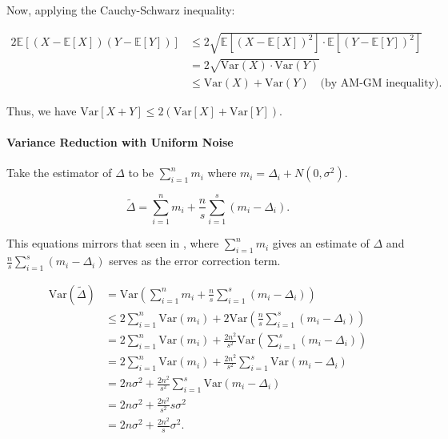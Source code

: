 \documentclass[11pt, margin=1in]{article}
\begin{document}
Now, applying the Cauchy-Schwarz inequality:

\[
\begin{aligned}
2\mathbb{E}[(X - \mathbb{E}[X])(Y - \mathbb{E}[Y])] 
&\leq 2 \sqrt{\mathbb{E}[(X - \mathbb{E}[X])^2] \cdot \mathbb{E}[(Y - \mathbb{E}[Y])^2]} \\
&= 2 \sqrt{\mathrm{Var}(X) \cdot \mathrm{Var}(Y)} \\
&\leq \mathrm{Var}(X) + \mathrm{Var}(Y) \quad \text{(by AM-GM inequality)}.
\end{aligned}
\]

Thus, we have $\mathrm{Var}\left[X+Y\right] \leq 2\left(\mathrm{Var}\left[X\right] + \mathrm{Var}\left[Y\right]\right)$.

\paragraph{Variance Reduction with Uniform Noise}

Take the estimator of $\Delta$ to be $\sum_{i = 1}^{n} m_i$ where $m_i = \Delta_i + N\left(0, \sigma^2\right)$.

\[
\tilde{\Delta} = \sum_{i = 1}^{n} m_i + \frac{n}{s} \sum_{i = 1}^{s} \left(m_i - \Delta_i\right).
\]

This equations mirrors that seen in , where $\sum_{i = 1}^{n} m_i$ gives an estimate of $\Delta$ and $\frac{n}{s} \sum_{i = 1}^{s} \left(m_i - \Delta_i\right)$ serves as the error correction term.

\[
\begin{aligned}
\mathrm{Var}\left(\tilde{\Delta}\right) &= \mathrm{Var}\left( \sum_{i = 1}^{n} m_i + \frac{n}{s} \sum_{i = 1}^{s} \left(m_i - \Delta_i\right)\right) \\
&\leq 2\sum_{i = 1}^{n} \mathrm{Var}\left(m_i\right) + 2\mathrm{Var}\left(\frac{n}{s} \sum_{i = 1}^{s} \left(m_i - \Delta_i\right)\right) \\
&= 2\sum_{i = 1}^{n} \mathrm{Var}\left(m_i\right) + \frac{2n^2}{s^2} \mathrm{Var}\left(\sum_{i = 1}^{s} \left(m_i - \Delta_i\right)\right) \\
&= 2\sum_{i = 1}^{n} \mathrm{Var}\left(m_i\right) + \frac{2n^2}{s^2} \sum_{i = 1}^{s} \mathrm{Var}\left(m_i - \Delta_i\right) \\
&= 2n \sigma^2 + \frac{2n^2}{s^2} \sum_{i = 1}^{s} \mathrm{Var}\left(m_i - \Delta_i\right) \\
&= 2n \sigma^2 + \frac{2n^2}{s^2} s \sigma^2 \\
&= 2n \sigma^2 + \frac{2n^2}{s} \sigma^2. \\
\end{aligned}
\]
\end{document}

